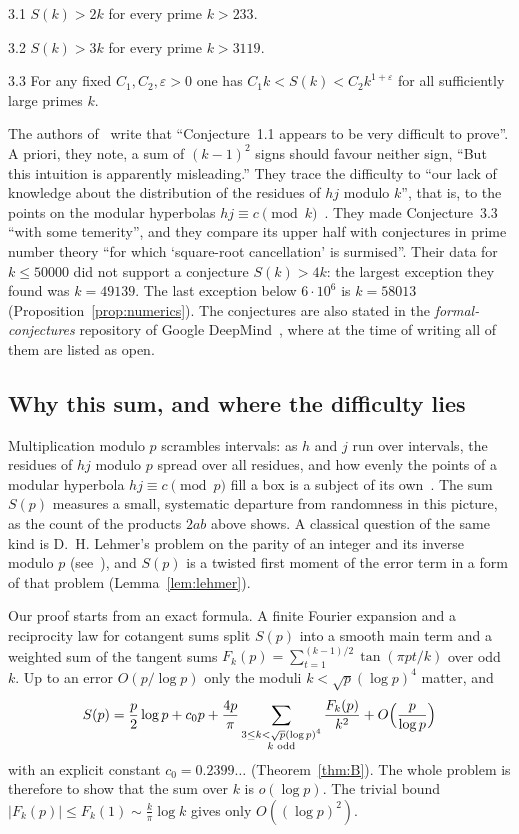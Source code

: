 \begin{bconj}{3.1}
$S(k)>2k$ for every prime $k>233$.
\end{bconj}

\begin{bconj}{3.2}
$S(k)>3k$ for every prime $k>3119$.
\end{bconj}

\begin{bconj}[growth]{3.3}
For any fixed $C_1,C_2,\varepsilon>0$ one has $C_1k<S(k)<C_2k^{1+\varepsilon}$ for all sufficiently large primes $k$.
\end{bconj}

The authors of~\cite{b1} write that ``Conjecture~1.1 appears to be very difficult to prove''. A priori, they note, a sum of $(k-1)^2$ signs should favour neither sign, ``But this intuition is apparently misleading.'' They trace the difficulty to ``our lack of knowledge about the distribution of the residues of $hj$ modulo $k$'', that is, to the points on the modular hyperbolas $hj\equiv c\pmod k$~\cite{b25}. They made Conjecture~3.3 ``with some temerity'', and they compare its upper half with conjectures in prime number theory ``for which `square-root cancellation' is surmised''. Their data for $k\le50000$ did not support a conjecture $S(k)>4k$: the largest exception they found was $k=49139$. The last exception below $6\cdot10^6$ is $k=58013$ (Proposition~\ref{prop:numerics}). The conjectures are also stated in the \emph{formal-conjectures} repository of Google DeepMind~\cite{b11}, where at the time of writing all of them are listed as open.

\subsection*{Why this sum, and where the difficulty lies}
Multiplication modulo $p$ scrambles intervals: as $h$ and $j$ run over intervals, the residues of $hj$ modulo $p$ spread over all residues, and how evenly the points of a modular hyperbola $hj\equiv c\pmod p$ fill a box is a subject of its own~\cite{b25}. The sum $S(p)$ measures a small, systematic departure from randomness in this picture, as the count of the products $2ab$ above shows. A classical question of the same kind is D.~H. Lehmer's problem on the parity of an integer and its inverse modulo $p$ (see~\cite{b30}), and $S(p)$ is a twisted first moment of the error term in a form of that problem (Lemma~\ref{lem:lehmer}).

Our proof starts from an exact formula. A finite Fourier expansion and a reciprocity law for cotangent sums split $S(p)$ into a smooth main term and a weighted sum of the tangent sums $F_k(p)=\sum_{t=1}^{(k-1)/2}\tan(\pi pt/k)$ over odd $k$. Up to an error $O(p/\log p)$ only the moduli $k<\sqrt p(\log p)^4$ matter, and
\[
S(p)=\frac p2\log p+c_0p+\frac{4p}\pi\sum_{\substack{3\le k<\sqrt p(\log p)^4\\ k\text{ odd}}}\frac{F_k(p)}{k^2}+O\Bigl(\frac p{\log p}\Bigr)
\]
with an explicit constant $c_0=0.2399\ldots$ (Theorem~\ref{thm:B}). The whole problem is therefore to show that the sum over $k$ is $o(\log p)$. The trivial bound $|F_k(p)|\le F_k(1)\sim\frac k\pi\log k$ gives only $O((\log p)^2)$.

